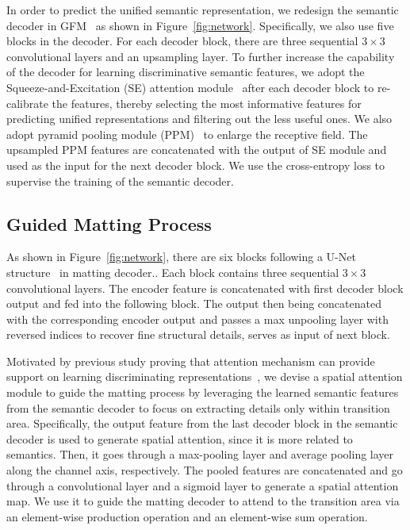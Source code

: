 \documentclass{article}
\begin{document}
In order to predict the unified semantic representation, we redesign the semantic decoder in GFM~\cite{gfm} as shown in Figure~\ref{fig:network}. Specifically, we also use five blocks in the decoder. For each decoder block, there are three sequential $3\times3$ convolutional layers and an upsampling layer. To further increase the capability of the decoder for learning discriminative semantic features, we adopt the Squeeze-and-Excitation (SE) attention module~\cite{hu2018squeeze} after each decoder block to re-calibrate the features, thereby selecting the most informative features for predicting unified representations and filtering out the less useful ones. We also adopt pyramid pooling module (PPM)~\cite{zhao2017pyramid} to enlarge the receptive field. The upsampled PPM features are concatenated with the output of SE module and used as the input for the next decoder block. We use the cross-entropy loss to supervise the training of the semantic decoder.

\subsection{Guided Matting Process}

 As shown in Figure~\ref{fig:network}, there are six blocks following a U-Net structure~\cite{ronneberger2015u} in matting decoder.. Each block contains three sequential $3\times3$ convolutional layers. The encoder feature is concatenated with first decoder block output and fed into the following block. The output then being concatenated with the corresponding encoder output and passes a max unpooling layer with reversed indices to recover fine structural details, serves as input of next block.

Motivated by previous study proving that attention mechanism can provide support on learning discriminating representations~\cite{ma2020auto}, we devise a spatial attention module to guide the matting process by leveraging the learned semantic features from the semantic decoder to focus on extracting details only within transition area. Specifically, the output feature from the last decoder block in the semantic decoder is used to generate spatial attention, since it is more related to semantics. Then, it goes through a max-pooling layer and average pooling layer along the channel axis, respectively. The pooled features are concatenated and go through a convolutional layer and a sigmoid layer to generate a spatial attention map. We use it to guide the matting decoder to attend to the transition area via an element-wise production operation and an element-wise sum operation. 
\end{document}
